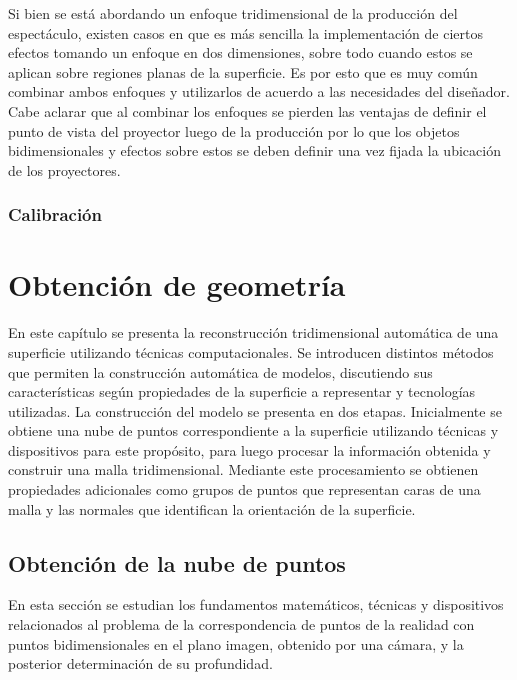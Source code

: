 Si bien se está abordando un enfoque tridimensional de la producción del espectáculo, existen casos en que es más sencilla la implementación de ciertos efectos tomando un enfoque en dos dimensiones, sobre todo cuando estos se aplican sobre regiones planas de la superficie. Es por esto que es muy común combinar ambos enfoques y utilizarlos de acuerdo a las necesidades del diseñador. Cabe aclarar que al combinar los enfoques se pierden las ventajas de definir el punto de vista del proyector luego de la producción por lo que los objetos bidimensionales y efectos sobre estos se deben definir una vez fijada la ubicación de los proyectores.

\subsubsection{Calibración}


\section{Obtención de geometría}

En este capítulo se presenta la reconstrucción tridimensional automática de una superficie utilizando técnicas computacionales.
Se introducen distintos métodos que permiten la construcción automática de modelos, discutiendo sus características según propiedades de la superficie a representar y tecnologías utilizadas.
La construcción del modelo se presenta en dos etapas. Inicialmente se obtiene una nube de puntos correspondiente a la superficie utilizando técnicas y dispositivos para este propósito, para luego procesar la información obtenida y construir una malla tridimensional. Mediante este procesamiento se obtienen propiedades adicionales como grupos de puntos que representan caras de una malla y las normales que identifican la orientación de la superficie.

\subsection{Obtención de la nube de puntos}

En esta sección se estudian los fundamentos matemáticos, técnicas y dispositivos relacionados al problema de la correspondencia de puntos de la realidad con puntos bidimensionales en el plano imagen, obtenido por una cámara, y la posterior determinación de su profundidad. 

